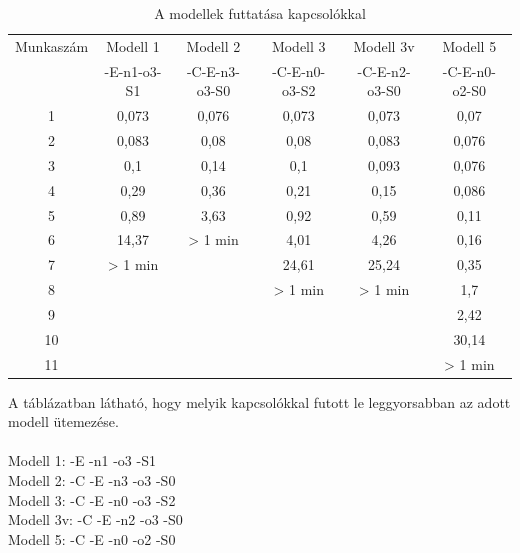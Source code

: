\documentclass {report}
\begin{document}
   \begin{table}[htpb]
   \label{tab:kapcsolo}
              \centering
              \setlength{\tabcolsep}{1pt}
    	\begin{tabular}{c|c|c|c|c|c}
    	
    	Munkaszám & Modell 1 & Modell 2 & Modell 3 & Modell 3v & Modell 5 \\ 
    	
    	 & -E-n1-o3-S1 & -C-E-n3-o3-S0 & -C-E-n0-o3-S2 & -C-E-n2-o3-S0 & -C-E-n0-o2-S0 \\ 
    	\hline 
    	1 & 0,073 & 0,076 & 0,073 & 0,073 & 0,07 \\ 
     
    	2 & 0,083 & 0,08 & 0,08 & 0,083 & 0,076 \\ 
     
    	3 & 0,1 & 0,14 & 0,1 & 0,093 & 0,076 \\ 
    
    	4 & 0,29 & 0,36 & 0,21 & 0,15 & 0,086 \\ 
    
    	5 & 0,89 & 3,63 & 0,92 & 0,59 & 0,11 \\ 
    
    	6 & 14,37 & > 1 min & 4,01 & 4,26 & 0,16 \\ 
    
    	7 & > 1 min &  & 24,61 & 25,24 & 0,35 \\ 
    
    	8 &  &  & > 1 min & > 1 min & 1,7 \\ 
    
    	9 &  &  &  &  & 2,42 \\ 
    
    	10 &  &  &  &  & 30,14 \\ 
    	11 &  &  &  &  & > 1 min \\ 
    	\end{tabular} 
    	\caption{A modellek futtatása kapcsolókkal}
   \end{table}
    A táblázatban látható, hogy melyik kapcsolókkal futott le leggyorsabban az adott modell ütemezése.\\\\
    Modell 1: -E -n1 -o3 -S1\\
    Modell 2: -C -E -n3 -o3 -S0\\
   	Modell 3: -C -E -n0 -o3 -S2\\
   	Modell 3v: -C -E -n2 -o3 -S0\\
    Modell 5: -C -E -n0 -o2 -S0\\\\
\end{document}
